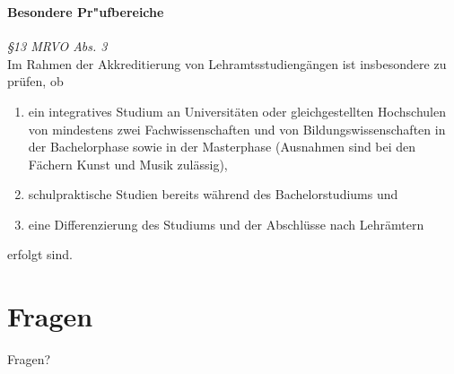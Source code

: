 \documentclass[german,10pt,xcolor=colortbl,compress]{beamer}
\begin{document}
\begin{frame}
\frametitle{\insertsection}
\framesubtitle{Besondere Pr"ufbereiche}
\textit{\S 13 MRVO Abs. 3}\\\vspace*{.5cm}
Im Rahmen der Akkreditierung von Lehramtsstudiengängen ist 
insbesondere zu prüfen, ob 
\begin{enumerate}[(1)]
\item  ein integratives Studium an Universitäten oder gleichgestellten Hochschulen von mindestens zwei Fachwissenschaften und von Bildungswissenschaften in der Bachelorphase sowie  in der Masterphase (Ausnahmen sind bei den Fächern Kunst und Musik zulässig), 
\item schulpraktische Studien bereits während des Bachelorstudiums und 
\item eine Differenzierung des Studiums und der Abschlüsse nach Lehrämtern
\end{enumerate}
erfolgt  sind. 
\end{frame}

\section*{Fragen}
\begin{frame}
\centering
\Large{ Fragen?}
\end{frame}
\end{document}

